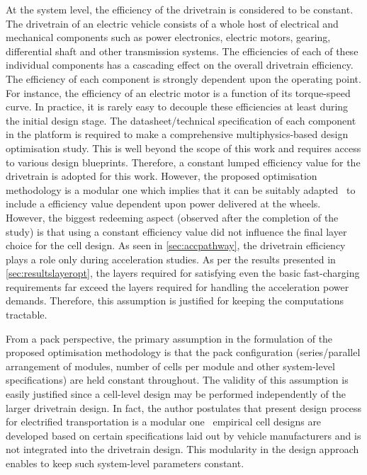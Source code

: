 At  the system  level, the  efficiency  of the  drivetrain is  considered to  be
constant. The  drivetrain of  an electric  vehicle consists of  a whole  host of
electrical and mechanical components such as power electronics, electric motors,
gearing, differential shaft and other  transmission systems. The efficiencies of
each  of these  individual  components has  a cascading  effect  on the  overall
drivetrain efficiency.  The efficiency of  each component is  strongly dependent
upon the operating point. For instance, the efficiency of an electric motor is a
function  of  its  torque-speed  curve.  In  practice,  it  is  rarely  easy  to
decouple  these efficiencies  at  least  during the  initial  design stage.  The
datasheet/technical specification of each component  in the platform is required
to make  a comprehensive multiphysics-based  design optimisation study.  This is
well  beyond the  scope  of this  work  and requires  access  to various  design
blueprints. Therefore, a constant lumped  efficiency value for the drivetrain is
adopted  for this  work. However,  the  proposed optimisation  methodology is  a
modular  one which  implies that  it can  be suitably  adapted \eg~to  include a
efficiency  value dependent  upon power  delivered at  the wheels.  However, the
biggest redeeming  aspect (observed after the  completion of the study)  is that
using a constant  efficiency value did not influence the  final layer choice for
the cell  design. As  seen in  \cref{sec:accpathway}, the  drivetrain efficiency
plays a role  only during acceleration studies. As per  the results presented in
\cref{sec:resultslayeropt}, the  layers required  for satisfying even  the basic
fast-charging  requirements far  exceed  the layers  required  for handling  the
acceleration power demands. Therefore, this  assumption is justified for keeping
the computations tractable.

From  a  pack  perspective,  the   primary  assumption  in  the  formulation  of
the   proposed  optimisation   methodology  is   that  the   pack  configuration
(series/parallel arrangement  of modules, number  of cells per module  and other
system-level specifications) are held constant  throughout. The validity of this
assumption  is easily  justified  since  a cell-level  design  may be  performed
independently of  the larger drivetrain  design. In fact, the  author postulates
that  present design  process for  electrified transportation  is a  modular one
\ie~empirical cell designs are  developed based on certain specifications laid
out by vehicle  manufacturers and is not integrated into  the drivetrain design.
This  modularity  in the  design  approach  enables  to keep  such  system-level
parameters constant.

